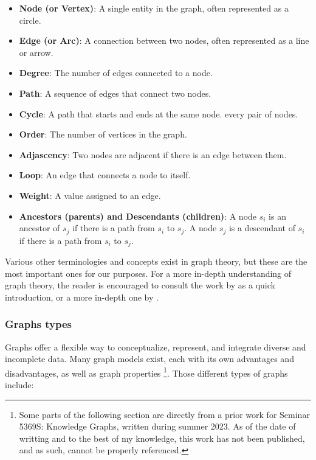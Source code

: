     \begin{itemize}
        \item \textbf{Node (or Vertex)}: A single entity in the graph, often represented as a circle.
        \item \textbf{Edge (or Arc)}: A connection between two nodes, often represented as a line or arrow.
        \item \textbf{Degree}: The number of edges connected to a node.
        \item \textbf{Path}: A sequence of edges that connect two nodes.
        \item \textbf{Cycle}: A path that starts and ends at the same node.
        every pair of nodes.
        \item \textbf{Order}: The number of vertices in the graph.
        \item \textbf{Adjascency}: Two nodes are adjacent if there is an edge between them.
        \item \textbf{Loop}: An edge that connects a node to itself.
        \item \textbf{Weight}: A value assigned to an edge.
        \item \textbf{Ancestors (parents) and Descendants (children)}: A node \(s_i\) is an ancestor of \(s_j\) if there is a path from \(s_i\) to \(s_j\). A node \(s_j\) is a descendant of \(s_i\) if there is a path from \(s_i\) to \(s_j\).
    \end{itemize}
    
    Various other terminologies and concepts exist in graph theory, but these are the most important ones for our purposes. For a more in-depth understanding of graph theory, the reader is encouraged to consult the work by \citeauthor{GraphTheorySolnon} as a quick introduction, \cite{GraphTheorySolnon} or a more in-depth one by \citeauthor{GraphTheoryIntro01} \cite{GraphTheoryIntro01}.

    \subsubsection{Graphs types}
    Graphs offer a flexible way to conceptualize, represent, and integrate diverse and incomplete data. Many graph models exist, each with its own advantages and disadvantages, as well as graph properties \footnote{Some parts of the following section are directly from a prior work for Seminar 5369S: Knowledge Graphs, written during summer 2023. As of the date of writting and to the best of my knowledge, this work has not been published, and as such, cannot be properly referenced.}. Those different types of graphs include:

